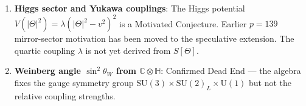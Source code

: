 \documentclass[11pt,a4paper]{article}
\theoremstyle{definition}
\theoremstyle{remark}
\newcommand{\Ltwo}{\textbf{[L2]}}
\newcommand{\OPEN}{\textbf{[OPEN]}}
\begin{document}
\begin{enumerate}
        \textit{v72 — Two-component approach}: The resolution has been
        identified and set up explicitly (see
        \texttt{research\_tracks/research/graviton\_schwarzschild.tex}~§7.3):
        \begin{itemize}
          \item Two-component even-parity Ansatz:
                $\Theta_1^{\text{even}} =
                  [H_0(r)\mathbf{1} + H_2(r)\boldsymbol{e}_r\boldsymbol{e}_r]
                  Y_{2m}\,e^{-i\omega t}$
                (plus angular component $K(r)$, eliminated by Zerilli gauge).
          \item Linearising $\nabla^\dagger\nabla\Theta = 0$ around the
                Schwarzschild background yields a coupled $2\times 2$ ODE
                for $(H_0, H_2)$.
          \item The Zerilli master variable
                $Z = 2r^2H_0/(2r+3M) + \cdots$
                formally decouples the system into the Zerilli equation.
          \item \textbf{Pending}: explicit extraction of the off-diagonal
                coupling coefficients from the UBT action and verification
                that the master equation reproduces $V_Z(r)$ exactly.
        \end{itemize}
        Status: \OPEN\ [\Ltwo] — structural identification complete;
        explicit coefficient computation not yet done.
        If the two-component computation succeeds: Zerilli from UBT
        Proved [L1] — major result for the second paper.

  \item \textbf{Higgs sector and Yukawa couplings}:
        The Higgs potential $V(|\Theta|^2) = \lambda(|\Theta|^2-v^2)^2$ is
        a Motivated Conjecture.  Earlier $p=139$ mirror-sector motivation has been
        moved to the speculative extension.  The quartic coupling
        $\lambda$ is not yet derived from $S[\Theta]$.

  \item \textbf{Weinberg angle $\sin^2\theta_W$ from $\mathbb{C}\otimes\mathbb{H}$}:
        Confirmed Dead End --- the algebra fixes the gauge symmetry group
        $\mathrm{SU}(3)\times\mathrm{SU}(2)_L\times\mathrm{U}(1)$ but
        not the relative coupling strengths.
\end{enumerate}

\end{document}

